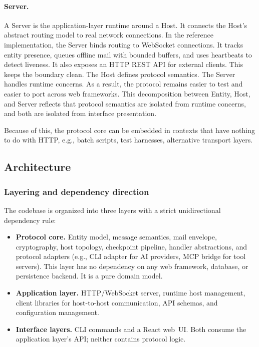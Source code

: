 \documentclass{llmxive}
\begin{document}
\paragraph{Server.}
A Server is the application-layer runtime around a Host. It connects the Host's abstract routing model to real network connections. In the reference implementation, the Server binds routing to WebSocket connections.
It tracks entity presence, queues offline mail with bounded buffers, and uses heartbeats to detect liveness. It also exposes an HTTP REST API for external clients.
This keeps the boundary clean. The Host defines protocol semantics. The Server handles runtime concerns. As a result, the protocol remains easier to test and easier to port across web frameworks.
\medskip
\noindent This decomposition between Entity, Host, and
Server reflects that protocol semantics are
isolated from runtime concerns, and both are isolated from interface presentation. 

Because of this, the protocol core can be embedded in contexts that have nothing to do with HTTP, e.g., batch scripts, test harnesses, alternative transport layers.

\subsection{Architecture}
\label{app:architecture}

\subsubsection{Layering and dependency direction}

The codebase is organized into three layers with a strict unidirectional
dependency rule:

\begin{itemize}
    \item \textbf{Protocol core.}  Entity model, message semantics, mail
      envelope, cryptography, host topology, checkpoint pipeline, handler
      abstractions, and protocol adapters (e.g., CLI adapter for AI
      providers, MCP bridge for tool servers).  This layer has no
      dependency on any web framework, database, or persistence backend.
      It is a pure domain model.

    \item \textbf{Application layer.}  HTTP/WebSocket server, runtime
      host management, client libraries for host-to-host communication,
      API schemas, and configuration management.

    \item \textbf{Interface layers.}  CLI commands and a React web~UI.
      Both consume the application layer's API; neither contains protocol
      logic.
\end{itemize}
\end{document}
